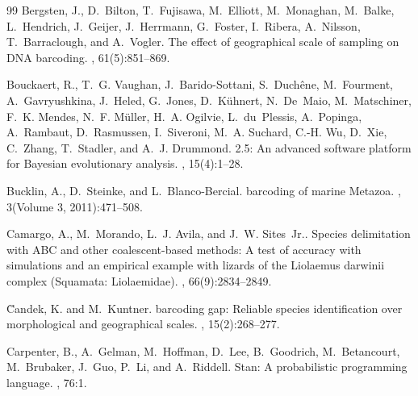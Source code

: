 \documentclass[12pt]{article}
\begin{document}
\begin{thebibliography}{99}
Bergsten, J., D.~Bilton, T.~Fujisawa, M.~Elliott, M.~Monaghan, M.~Balke,
  L.~Hendrich, J.~Geijer, J.~Herrmann, G.~Foster, I.~Ribera, A.~Nilsson,
  T.~Barraclough, and A.~Vogler\leavevmode\nopagebreak{}.
\newblock The effect of geographical scale of sampling on {DNA} barcoding.
, 61(5):851--869.

Bouckaert, R., T.~G. Vaughan, J.~Barido-Sottani, S.~Duchêne, M.~Fourment,
  A.~Gavryushkina, J.~Heled, G.~Jones, D.~Kühnert, N.~De~Maio, M.~Matschiner,
  F.~K. Mendes, N.~F. Müller, H.~A. Ogilvie, L.~du~Plessis, A.~Popinga,
  A.~Rambaut, D.~Rasmussen, I.~Siveroni, M.~A. Suchard, C.-H. Wu, D.~Xie,
  C.~Zhang, T.~Stadler, and A.~J. Drummond\leavevmode\nopagebreak{}.
 2.5: An advanced software platform for {B}ayesian
  evolutionary analysis.
, 15(4):1--28.

Bucklin, A., D.~Steinke, and L.~Blanco-Bercial\leavevmode\nopagebreak{}.
 barcoding of marine {M}etazoa.
, 3(Volume 3, 2011):471--508.

Camargo, A., M.~Morando, L.~J. Avila, and J.~W.
  Sites~Jr.\leavevmode\nopagebreak{}.
\newblock Species delimitation with {ABC} and other coalescent-based methods: A
  test of accuracy with simulations and an empirical example with lizards of
  the {L}iolaemus darwinii complex ({S}quamata: {L}iolaemidae).
, 66(9):2834--2849.

{\u{C}}andek, K. and M.~Kuntner\leavevmode\nopagebreak{}.
 barcoding gap: {R}eliable species identification over
  morphological and geographical scales.
, 15(2):268--277.

Carpenter, B., A.~Gelman, M.~Hoffman, D.~Lee, B.~Goodrich, M.~Betancourt,
  M.~Brubaker, J.~Guo, P.~Li, and A.~Riddell\leavevmode\nopagebreak{}.
\newblock Stan: {A} probabilistic programming language.
, 76:1.


\end{thebibliography}
\end{document}
